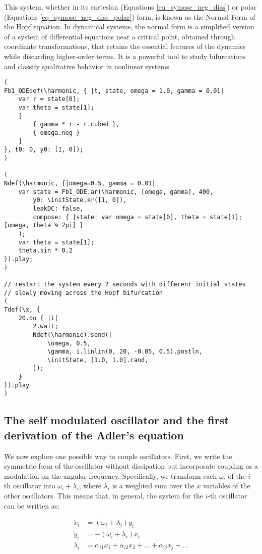\documentclass{article}
\begin{document}
This system, whether in its cartesian (Equations {\ref{eq_symosc_neg_diss}}) or polar (Equations \ref{eq_symosc_neg_diss_polar}) form, is known as the Normal Form of the Hopf equation. 
In dynamical systems, the normal form is a simplified version of a system of differential equations near a critical point, obtained through coordinate transformations, that retains the essential features of the dynamics while discarding higher-order terms. 
It is a powerful tool to study bifurcations and classify qualitative behavior in nonlinear systems.


\begin{lstlisting}[caption=Exploring the Hopf bifurcation of a self-oscillator.]
(
Fb1_ODEdef(\harmonic, { |t, state, omega = 1.0, gamma = 0.01|
	var r = state[0];
	var theta = state[1];
	[
		{ gamma * r - r.cubed },
		{ omega.neg }
	]
}, t0: 0, y0: [1, 0]);
)

(
Ndef(\harmonic, {|omega=0.5, gamma = 0.01|
	var state = Fb1_ODE.ar(\harmonic, [omega, gamma], 400,
		y0: \initState.kr([1, 0]),
		leakDC: false,
		compose: { |state| var omega = state[0], theta = state[1]; [omega, theta % 2pi] }
	);
	var theta = state[1];
	theta.sin * 0.2
}).play;
)

// restart the system every 2 seconds with different initial states
// slowly moving across the Hopf bifurcation
(
Tdef(\x, {
	20.do { |i|
		2.wait;
		Ndef(\harmonic).send([
			\omega, 0.5,
			\gamma, i.linlin(0, 20, -0.05, 0.5).postln,
			\initState, [1.0, 1.0].rand,
		]);
	}
}).play
)

\end{lstlisting}


\subsection{The self modulated oscillator and the first derivation of the Adler's equation}

We now explore one possible way to couple oscillators. 
First, we write the symmetric form of the oscillator without dissipation but incorporate coupling as a modulation on the angular frequency. 
Specifically, we transform each $\omega_i$ of the $i$-th oscillator into $\omega_i + \lambda_i$, where $\lambda_i$ is a weighted sum over the $x$ variables of the other oscillators. 
This means that, in general, the system for the $i$-th oscillator can be written as:

\begin{subequations} \label{eq_coupled_oscillators}
\begin{align}
    \dot{x}_i & = (\omega_i + \lambda_i) y_i \\
    \dot{y}_i & = -(\omega_i + \lambda_i) x_i \\
    \lambda_i & = \alpha_{i1} x_1 + \alpha_{i2} x_2 + \dots + \alpha_{ij} x_j + \dots
\end{align}
\end{subequations}
\end{document}
